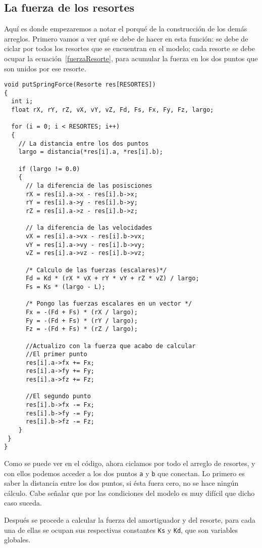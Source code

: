 \subsection{La fuerza de los resortes}
Aquí es donde empezaremos a notar el porqué de la construcción de los demás arreglos. Primero vamos a ver qué se debe de hacer en esta función: se debe de ciclar por todos los resortes que se encuentran en el modelo; cada resorte se debe ocupar la ecuación~\ref{fuerzaResorte}, para acumular la fuerza en los dos puntos que son unidos por ese resorte.
\begin{verbatim}
void putSpringForce(Resorte res[RESORTES])
{
  int i;
  float rX, rY, rZ, vX, vY, vZ, Fd, Fs, Fx, Fy, Fz, largo;

  for (i = 0; i < RESORTES; i++)
  {
    // La distancia entre los dos puntos
    largo = distancia(*res[i].a, *res[i].b);

    if (largo != 0.0)
    {
      // la diferencia de las posisciones
      rX = res[i].a->x - res[i].b->x;
      rY = res[i].a->y - res[i].b->y;
      rZ = res[i].a->z - res[i].b->z;

      // la diferencia de las velocidades
      vX = res[i].a->vx - res[i].b->vx;
      vY = res[i].a->vy - res[i].b->vy;
      vZ = res[i].a->vz - res[i].b->vz;

      /* Calculo de las fuerzas (escalares)*/
      Fd = Kd * (rX * vX + rY * vY + rZ * vZ) / largo;
      Fs = Ks * (largo - L);

      /* Pongo las fuerzas escalares en un vector */
      Fx = -(Fd + Fs) * (rX / largo);
      Fy = -(Fd + Fs) * (rY / largo);
      Fz = -(Fd + Fs) * (rZ / largo);

      //Actualizo con la fuerza que acabo de calcular
      //El primer punto
      res[i].a->fx += Fx;
      res[i].a->fy += Fy;
      res[i].a->fz += Fz;

      //El segundo punto
      res[i].b->fx -= Fx;
      res[i].b->fy -= Fy;
      res[i].b->fz -= Fz;
    }
 }
}
\end{verbatim} 
Como se puede ver en el código, ahora ciclamos por todo el arreglo de resortes, y con ellos podemos acceder a los dos puntos \verb|a| y \verb|b| que conectan. Lo primero es saber la distancia entre los dos puntos, si ésta fuera cero, no se hace ningún cálculo. Cabe señalar que por las condiciones del modelo es muy difícil que dicho caso suceda.

Después se procede a calcular la fuerza del amortiguador y del resorte, para cada una de ellas se ocupan sus respectivas constantes \verb|Ks| y \verb|Kd|, que son variables globales.


